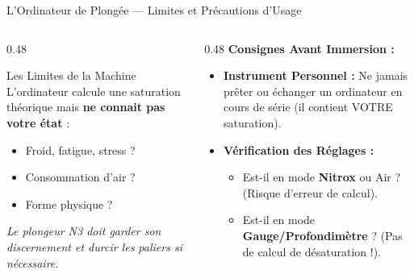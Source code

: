 \begin{frame}{L'Ordinateur de Plongée — Limites et Précautions d'Usage}
    \begin{columns}[t]
        \begin{column}{0.48\textwidth}
            \begin{alertblock}{Les Limites de la Machine}
                L'ordinateur calcule une saturation théorique mais \textbf{ne connait pas votre état} :
                \begin{itemize}
                    \item Froid, fatigue, stress ?
                    \item Consommation d'air ?
                    \item Forme physique ?
                \end{itemize}
                \textit{Le plongeur N3 doit garder son discernement et durcir les paliers si nécessaire.}
            \end{alertblock}
        \end{column}

        \begin{column}{0.48\textwidth}
            \textbf{Consignes Avant Immersion :}
            \begin{itemize}
                \item \textbf{Instrument Personnel :} Ne jamais prêter ou échanger un ordinateur en cours de série (il contient VOTRE saturation).
                \item \textbf{Vérification des Réglages :}
                \begin{itemize}
                    \item Est-il en mode \textbf{Nitrox} ou Air ? (Risque d'erreur de calcul).
                    \item Est-il en mode \textbf{Gauge/Profondimètre} ? (Pas de calcul de désaturation !).
                \end{itemize}
            \end{itemize}
        \end{column}
    \end{columns}
\end{frame}

